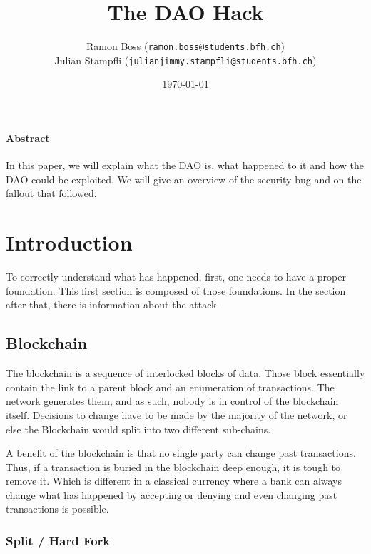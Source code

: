 \documentclass[a4paper, 11pt]{scrartcl}
\begin{document}
\title{The DAO Hack}
\date{\today}   %
\author{
  Ramon Boss (\texttt{ramon.boss@students.bfh.ch}) \\
  Julian Stampfli (\texttt{julianjimmy.stampfli@students.bfh.ch})
}

\maketitle

\paragraph{Abstract}

In this paper, we will explain what the DAO is, what happened to it and how the DAO could be exploited.
We will give an overview of the security bug and on the fallout that followed.

\setcounter{tocdepth}{2}
\tableofcontents
\clearpage

\section{Introduction}

To correctly understand what has happened, first, one needs to have a proper foundation.
This first section is composed of those foundations. In the section after that, there is information about the attack.

\subsection{Blockchain}

The blockchain is a sequence of interlocked blocks of data.
Those block essentially contain the link to a parent block and an enumeration of transactions. The network generates them, and as such, nobody is in control of the blockchain itself.
Decisions to change have to be made by the majority of the network, or else the Blockchain would split into two different sub-chains. \cite{blockchainKai}

A benefit of the blockchain is that no single party can change past transactions.
Thus, if a transaction is buried in the blockchain deep enough, it is tough to remove it. Which is different in a classical currency where a bank can always change what has happened by accepting or denying and even changing past transactions is possible. \cite{blockchainKai}

\subsubsection{Split / Hard Fork}
\end{document}

